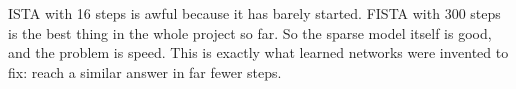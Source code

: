 \begin{keyidea}
ISTA with 16 steps is awful because it has barely started. FISTA with 300 steps is the best thing in
the whole project so far. So the sparse model itself is good, and the problem is speed. This is exactly
what learned networks were invented to fix: reach a similar answer in far fewer steps.
\end{keyidea}
